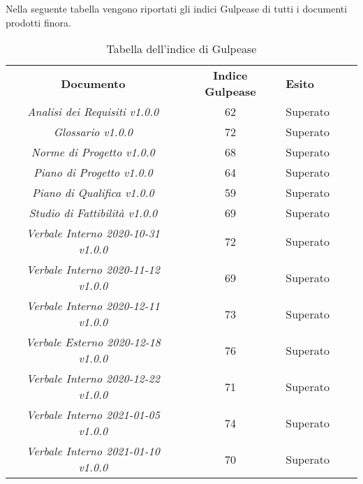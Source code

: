 Nella seguente tabella vengono riportati gli indici Gulpease\glo{} di tutti
i documenti prodotti finora.
\renewcommand{\arraystretch}{1.5}
\begin{longtable}{ c c  C{4cm}  c  c }
    \caption{Tabella dell'indice di Gulpease} \\
    \rowcolor{\primaryColor}
    \textcolor{\secondaryColor}{
    \centering\textbf{Documento}}     & \textcolor{\secondaryColor}{\centering\textbf{Indice Gulpease}}    & \textcolor{\secondaryColor}
    {\centering\textbf{Esito}} \\
    \textit{Analisi dei Requisiti v1.0.0}           & 62                                    & Superato{} \\
    \textit{Glossario v1.0.0}                       & 72                                    & Superato{} \\
    \textit{Norme di Progetto v1.0.0}               & 68                                   & Superato{} \\
    \textit{Piano di Progetto v1.0.0}                & 64                                    & Superato{} \\
    \textit{Piano di Qualifica v1.0.0}                & 59                                    & Superato{} \\
    \textit{Studio di Fattibilità v1.0.0}               & 69                                    & Superato{} \\
    \textit{Verbale Interno 2020-10-31 v1.0.0}          & 72                                    & Superato{} \\
    \textit{Verbale Interno 2020-11-12 v1.0.0}          & 69                                    & Superato{} \\
    \textit{Verbale Interno 2020-12-11 v1.0.0}          & 73                                    & Superato{} \\
    \textit{Verbale Esterno 2020-12-18 v1.0.0}          & 76                                    & Superato{} \\
    \textit{Verbale Interno 2020-12-22 v1.0.0}          & 71                                    & Superato{} \\
    \textit{Verbale Interno 2021-01-05 v1.0.0}          & 74                                    & Superato{} \\
    \textit{Verbale Interno 2021-01-10 v1.0.0}          & 70                                    & Superato{} \\

\end{longtable}



